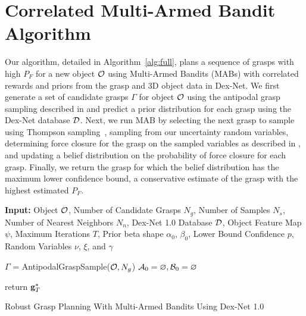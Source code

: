 \section{Correlated Multi-Armed Bandit Algorithm}
Our algorithm, detailed in Algorithm~\ref{alg:full}, plans a sequence of grasps with high $P_F$ for a new object $\mathcal{O}$ using Multi-Armed Bandits (MABs) with correlated rewards and priors from the grasp and 3D object data in Dex-Net.
We first generate a set of candidate grasps $\Gamma$ for object $\mathcal{O}$ using the antipodal grasp sampling described in  and predict a prior distribution for each grasp using the Dex-Net database $\mathcal{D}$.
Next, we run MAB by selecting the next grasp to sample using Thompson sampling~\cite{laskey2015bandits}, sampling from our uncertainty random variables, determining force closure for the grasp on the sampled variables as described in , and updating a belief distribution on the probability of force closure for each grasp.
Finally, we return the grasp for which the belief distribution has the maximum lower confidence bound, a conservative estimate of the grasp with the highest estimated $P_F$.

\begin{algorithm}
{\small
    \SetAlgoLined
    {\bf Input:} Object $\mathcal{O}$, Number of Candidate Grasps $N_g$, Number of Samples $N_s$, Number of Nearest Neighbors $N_n$, Dex-Net 1.0 Database $\mathcal{D}$, Object Feature Map $\psi$,  Maximum Iterations $T$, Prior beta shape $\alpha_0$, $\beta_0$, Lower Bound Confidence $p$, Random Variables $\nu$, $\xi$, and $\gamma$ \\
    
	$\Gamma$ = AntipodalGraspSample($\mathcal{O}, N_g$) \;
	$\mathcal{A}_0 = \varnothing, \mathcal{B}_0 = \varnothing$\;
	
	return $\mathbf{g}_T^*$\;
    \caption{Robust Grasp Planning With Multi-Armed Bandits Using Dex-Net 1.0}
    \label{alg:full}
}
\end{algorithm}

